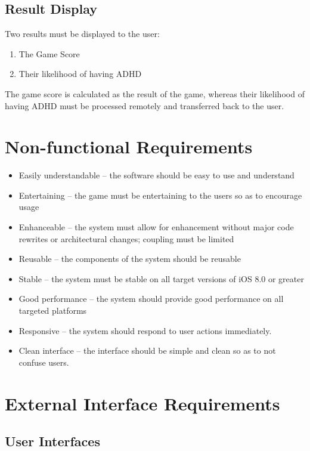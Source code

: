 \documentclass[a4wide]{article}
\begin{document}
\subsection{Result Display}
Two results must be displayed to the user:
\begin{enumerate}
\item The Game Score
\item Their likelihood of having ADHD
\end{enumerate}
The game score is calculated as the result of the game, whereas their likelihood
of having ADHD must be processed remotely and transferred back to the user.

\section{Non-functional Requirements}
\begin{itemize}
\item Easily understandable -- the software should be easy to use and understand
\item Entertaining -- the game must be entertaining to the users so as to
encourage usage
\item Enhanceable -- the system must allow for enhancement without major code
rewrites or architectural changes; coupling must be limited
\item Reusable -- the components of the system should be reusable
\item Stable -- the system must be stable on all target versions of iOS 8.0 or greater
\item Good performance -- the system should provide good performance on all
targeted platforms
\item Responsive -- the system should respond to user actions immediately.
\item Clean interface -- the interface should be simple and clean so as to not
confuse users.
\end{itemize}


\section{External Interface Requirements}

\subsection{User Interfaces}
\end{document}
